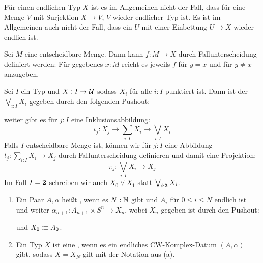 \begin{bemerkung}
  Für einen endlichen Typ \(X\) ist es im Allgemeinen nicht der Fall, dass für eine Menge \(V\) mit Surjektion \(X\to V\), \(V\) wieder endlicher Typ ist.
  Es ist im Allgemeinen auch nicht der Fall, dass ein \(U\) mit einer Einbettung \(U\to X\) wieder endlich ist.
\end{bemerkung}

\begin{bemerkung}
  Sei \(M\) eine entscheidbare Menge. Dann kann \(f:M\to X\) durch Fallunterscheidung definiert werden:
  Für gegebenes \(x:M\) reicht es jeweils \(f\) für \(y=x\) und für \(y\neq x\) anzugeben.
\end{bemerkung}

\begin{definition}
  Sei \(I\) ein Typ und \(X:I\to \mathcal{U}\) sodass \(X_i\) für alle \(i:I\) punktiert ist.
  Dann ist der  \(\bigvee_{i:I}X_i\) gegeben durch den folgenden Pushout:
  \begin{center}
  \end{center}
  weiter gibt es für \(j:I\) eine Inklusionsabbildung:
  \[
    \iota_j:X_j\to \sum_{i:I}X_i\to \bigvee_{i:I}X_i
  \]
  Falls \(I\) entscheidbare Menge ist, können wir für \(j:I\) eine Abbildung
  \(t_j:\sum_{i:I}X_i \to X_j\) durch Fallunterscheidung definieren und damit eine Projektion:
  \[
    \pi_j:\bigvee_{i:I}X_i \to X_j
  \]
  Im Fall \(I=\mathbf{2}\) schreiben wir auch \(X_0\vee X_1\)\index{\(\vee\)} statt \(\bigvee_{i:\mathbf{2}}X_i\).
\end{definition}

\begin{definition}
  \begin{enumerate}
  \item Ein Paar \(A,\alpha\) heißt , wenn es \(N:\mathbb{N}\) gibt und \(A_i\) für \(0\leq i \leq N\) endlich ist und weiter \(\alpha_{n+1}:A_{n+1}\times S^n\to X_n\), wobei \(X_n\) gegeben ist durch den Pushout:
    \begin{center}
    \end{center}
    und \(X_0\vcentcolon\mspace{-1.2mu}\equiv A_0\).
  \item Ein Typ \(X\) ist eine , wenn es ein endliches CW-Komplex-Datum \((A,\alpha)\) gibt, sodass \(X=X_N\) gilt mit der Notation aus (a).
  \end{enumerate}
\end{definition}

